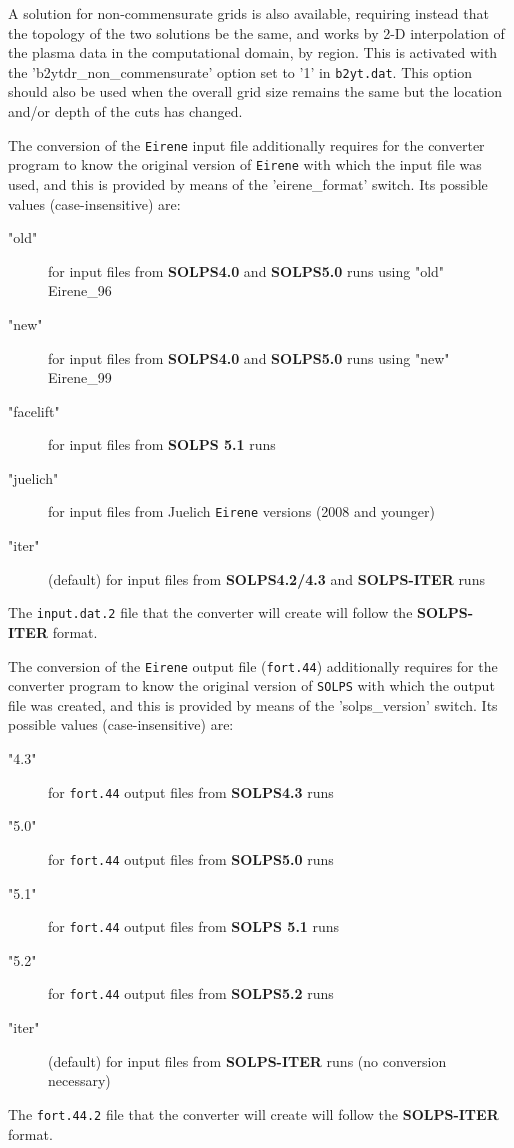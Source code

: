 \documentclass[a4paper,10pt]{report}
\newcommand\SOLPSfiveone{{\bf SOLPS 5.1} }
\newcommand\SOLPSITER{{\bf SOLPS-ITER} }
\begin{document}
A solution for non-commensurate grids is also available, requiring
instead that the topology of the two solutions be the same, and works by 2-D
interpolation of the plasma data in the computational domain, by region. This is
activated with the 'b2ytdr\_non\_commensurate' option set to '1' in {\tt b2yt.dat}. This option should also be used when the overall grid size remains the same but the location and/or depth of the cuts has changed.

The conversion of the {\tt Eirene} input file additionally requires for the converter program to know the original version of {\tt Eirene} with which the input file was used, and this is provided by means of the 'eirene\_format' switch. Its possible values (case-insensitive) are:
\begin{description}
  \item["old"] for input files from {\bf SOLPS4.0} and {\bf SOLPS5.0} runs using "old" Eirene\_96
  \item["new"] for input files from {\bf SOLPS4.0} and {\bf SOLPS5.0} runs using "new" Eirene\_99
  \item["facelift"] for input files from \SOLPSfiveone runs
  \item["juelich"] for input files from Juelich {\tt Eirene} versions (2008 and younger)
  \item["iter"] (default) for input files from {\bf SOLPS4.2/4.3} and \SOLPSITER runs
\end{description}
The {\tt input.dat.2} file that the converter will create will follow the \SOLPSITER format.

The conversion of the {\tt Eirene} output file ({\tt fort.44}) additionally requires for the converter program to know the original version of {\tt SOLPS} with which the output file was created, and this is provided by means of the 'solps\_version' switch. Its possible values (case-insensitive) are:
\begin{description}
  \item["4.3"] for {\tt fort.44} output files from {\bf SOLPS4.3} runs
  \item["5.0"] for {\tt fort.44} output files from {\bf SOLPS5.0} runs
  \item["5.1"] for {\tt fort.44} output files from \SOLPSfiveone runs
  \item["5.2"] for {\tt fort.44} output files from {\bf SOLPS5.2} runs
  \item["iter"] (default) for input files from \SOLPSITER runs (no conversion necessary)
\end{description}
The {\tt fort.44.2} file that the converter will create will follow the \SOLPSITER
format.
\end{document}
